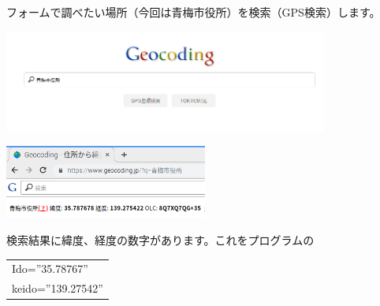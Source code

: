 フォームで調べたい場所（今回は青梅市役所）を検索（GPS検索）します。



\begin{center}
\includegraphics[width=0.8\textwidth]{./text08-img/textbook-img053.png}

\end{center}

\bigskip




\begin{center}
\includegraphics[width=0.5\textwidth]{./text08-img/textbook-img054.png}

\end{center}

\bigskip



検索結果に緯度、経度の数字があります。これをプログラムの






\begin{table}[htbp]
    \centering
    \begin{tabular}{|l|}
        \hline
        
        Ido=”35.78767”\\
        keido=”139.27542”\\
        \hline
    \end{tabular}
\end{table}


